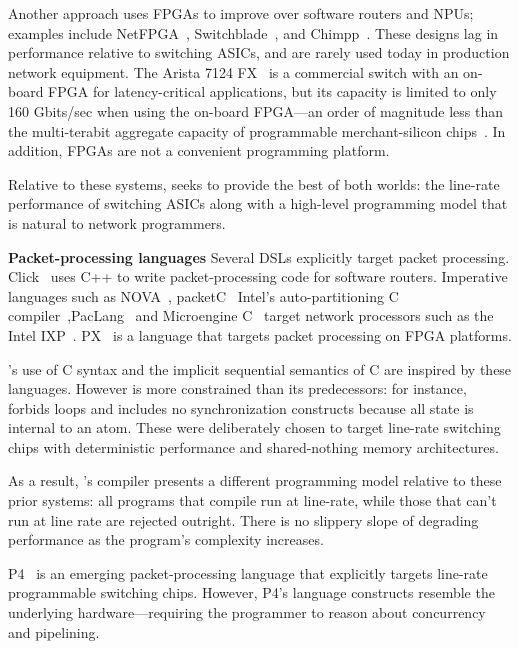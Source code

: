 Another approach uses FPGAs to improve over software routers and NPUs; examples
include NetFPGA~\cite{netfpga}, Switchblade~\cite{switchblade}, and
Chimpp~\cite{chimpp}. These designs lag in performance relative to switching
ASICs, and are rarely used today in production network equipment. The Arista
7124 FX~\cite{7124fx} is a commercial switch with an on-board FPGA for
latency-critical applications, but its capacity is limited to only 160
Gbits/sec when using the on-board FPGA---an order of magnitude less than the
multi-terabit aggregate capacity of programmable merchant-silicon
chips~\cite{xpliant}. In addition, FPGAs are not a convenient programming
platform.

Relative to these systems, \pktlanguage seeks to provide the best of both
worlds: the line-rate performance of switching ASICs along with a high-level
programming model that is natural to network programmers.

\textbf{Packet-processing languages}
Several DSLs explicitly target packet processing. Click~\cite{click} uses C++
to write packet-processing code for software routers. Imperative languages such
as NOVA~\cite{nova}, packetC~\cite{packetc} Intel's auto-partitioning C
compiler~\cite{intel_uiuc_pldi},PacLang~\cite{paclang_lang,
paclang_partitioner} and Microengine C~\cite{microenginec, intel_ixa} target
network processors such as the Intel IXP~\cite{ixp2800, ixp4xx}.  PX~\cite{PX}
is a language that targets packet processing on FPGA platforms.

\pktlanguage's use of C syntax and the implicit sequential semantics of C are
inspired by these languages. However \pktlanguage is more constrained than its
predecessors: for instance, \pktlanguage forbids loops and includes no
synchronization constructs because all state is internal to an atom. These were
deliberately chosen to target line-rate switching chips with deterministic
performance and shared-nothing memory architectures.

As a result, \pktlanguage's compiler presents a different programming model
relative to these prior systems: all \pktlanguage programs that compile run at
line-rate, while those that can't run at line rate are rejected outright. There
is no slippery slope of degrading performance as the program's complexity
increases.

P4~\cite{p4} is an emerging packet-processing language that explicitly targets
line-rate programmable switching chips. However, P4's language constructs
resemble the underlying hardware---requiring the programmer to reason about
concurrency and pipelining.

